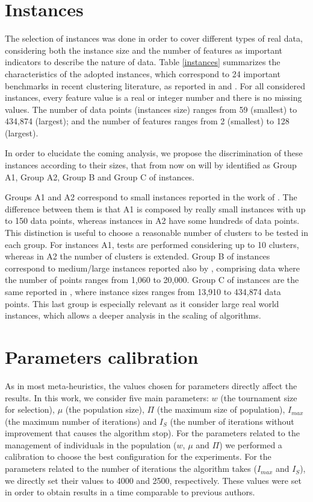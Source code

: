 \section{Instances}
\label{sec:instances}
The selection of instances was done in order to cover different types of real data, considering both the instance size and the number of features as important indicators to describe the nature of data. Table \ref{instances} summarizes the characteristics of the adopted instances, which correspond to 24 important benchmarks in recent clustering literature, as reported in \cite{Ordin2014} and \cite{Bagirov2016}. For all considered instances, every feature value is a real or integer number and there is no missing values. The number of data points (instances size) ranges from 59 (smallest) to 434,874 (largest); and the number of features ranges from 2 (smallest) to 128 (largest).

In order to elucidate the coming analysis, we propose the discrimination of these instances according to their sizes, that from now on will by identified as Group A1, Group A2, Group B and Group C of instances.

Groups A1 and A2 correspond to small instances reported in the work of \cite{Ordin2014}. The difference between them is that A1 is composed by really small instances with up to 150 data points, whereas instances in A2 have some hundreds of data points. This distinction is useful to choose a reasonable number of clusters to be tested in each group. For instances A1, tests are performed considering up to 10 clusters, whereas in A2 the number of clusters is extended. Group B of instances correspond to medium/large instances reported also by \cite{Ordin2014}, comprising data where the number of points ranges from 1,060 to 20,000. Group C of instances are the same reported in \cite{Bagirov2016}, where instance sizes ranges from 13,910 to 434,874 data points. This last group is especially relevant as it consider large real world instances, which allows a deeper analysis in the scaling of algorithms.



\section{Parameters calibration}
\label{sec:calibration}
As in most meta-heuristics, the values chosen for parameters directly affect the results. In this work, we consider five main parameters: $w$ (the tournament size for selection), $\mu$ (the population size), $\Pi$ (the maximum size of population), $I_{max}$ (the maximum number of iterations) and $I_S$ (the number of iterations without improvement that causes the algorithm stop). For the parameters related to the management of individuals in the population ($w$, $\mu$ and $\Pi$) we performed a calibration to choose the best configuration for the experiments. For the parameters related to the number of iterations the algorithm takes ($I_{max}$ and $I_S$), we directly set their values to 4000 and 2500, respectively. These values were set in order to obtain results in a time comparable to previous authors.

